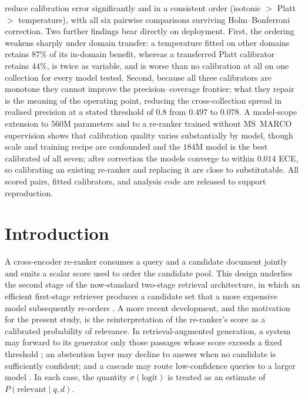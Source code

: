 \documentclass[sn-mathphys-num,pdflatex]{sn-jnl}
\newcommand{\sigmoid}{\sigma}
\begin{document}
{reduce calibration error significantly and in a consistent order (isotonic $>$
Platt $>$ temperature), with all six pairwise comparisons surviving
Holm--Bonferroni correction. Two further findings bear directly on deployment.
First, the ordering weakens sharply under domain transfer: a temperature fitted on
other domains retains $87\%$ of its in-domain benefit, whereas a transferred Platt
calibrator retains $44\%$, is twice as variable, and is worse than no calibration
at all on one collection for every model tested. Second, because all three calibrators are monotone they cannot improve the
precision--coverage frontier; what they repair is the meaning of the operating
point, reducing the cross-collection spread in realised precision at a stated
threshold of $0.8$ from $0.497$ to $0.078$. A model-scope extension to $560$M parameters and to a re-ranker
trained without MS~MARCO supervision shows that calibration quality varies
substantially by model, though scale and training recipe are confounded and the
$184$M model is the best calibrated of all seven; after correction the models
converge to within $0.014$ ECE, so calibrating an existing re-ranker and replacing
it are close to substitutable. All scored pairs, fitted calibrators, and analysis
code are released to support reproduction.}


\maketitle

\section{Introduction}\label{sec:intro}

A cross-encoder re-ranker consumes a query and a candidate document jointly and
emits a scalar score used to order the candidate pool. This design underlies the
second stage of the now-standard two-stage retrieval architecture, in which an
efficient first-stage retriever produces a candidate set that a more expensive
model subsequently re-orders \cite{nogueira2019}. A more recent development, and
the motivation for the present study, is the reinterpretation of the
re-ranker's score as a calibrated probability of relevance. In
retrieval-augmented generation, a system may forward to its generator only those
passages whose score exceeds a fixed threshold \cite{lewis2020rag}; an abstention
layer may decline to answer when no candidate is sufficiently confident; and a
cascade may route low-confidence queries to a larger model
\cite{gao2024rag}. In each case, the quantity $\sigmoid(\text{logit})$ is treated
as an estimate of $P(\text{relevant}\mid q,d)$.
\end{document}
